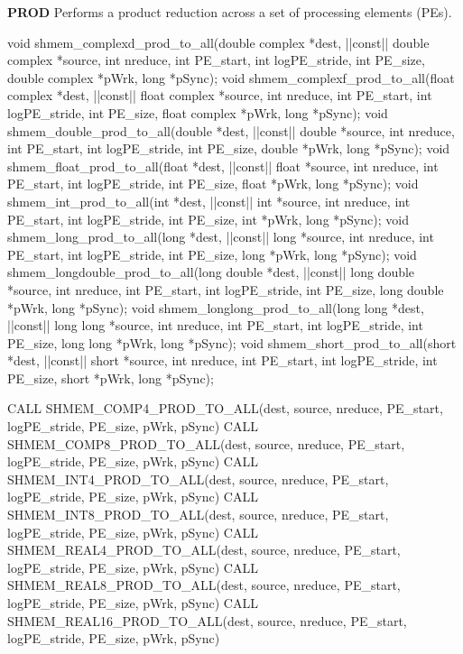 \begin{apidefinition}
\bigskip
\textbf{PROD} \newline
Performs a product reduction across a set of processing elements (\ac{PE}s).\newline
\begin{Csynopsis}
void shmem_complexd_prod_to_all(double complex *dest, |\aftergroup{}|const|\aftergroup\prevcolor| double complex *source, int nreduce, int PE_start, int logPE_stride, int PE_size, double complex *pWrk, long *pSync);
void shmem_complexf_prod_to_all(float complex *dest, |\aftergroup{}|const|\aftergroup\prevcolor| float complex *source, int nreduce, int PE_start, int logPE_stride, int PE_size, float complex *pWrk, long *pSync);
void shmem_double_prod_to_all(double *dest, |\aftergroup{}|const|\aftergroup\prevcolor| double *source, int nreduce, int PE_start, int logPE_stride, int PE_size, double *pWrk, long *pSync);
void shmem_float_prod_to_all(float *dest, |\aftergroup{}|const|\aftergroup\prevcolor| float *source, int nreduce, int PE_start, int logPE_stride, int PE_size, float *pWrk, long *pSync);
void shmem_int_prod_to_all(int *dest, |\aftergroup{}|const|\aftergroup\prevcolor| int *source, int nreduce, int PE_start, int logPE_stride, int PE_size, int *pWrk, long *pSync);
void shmem_long_prod_to_all(long *dest, |\aftergroup{}|const|\aftergroup\prevcolor| long *source, int nreduce, int PE_start, int logPE_stride, int PE_size, long *pWrk, long *pSync);
void shmem_longdouble_prod_to_all(long double *dest, |\aftergroup{}|const|\aftergroup\prevcolor| long double *source, int nreduce, int PE_start, int logPE_stride, int PE_size, long double *pWrk, long *pSync);
void shmem_longlong_prod_to_all(long long *dest, |\aftergroup{}|const|\aftergroup\prevcolor| long long *source, int nreduce, int PE_start, int logPE_stride, int PE_size, long long *pWrk, long *pSync);
void shmem_short_prod_to_all(short *dest, |\aftergroup{}|const|\aftergroup\prevcolor| short *source, int nreduce, int PE_start, int logPE_stride, int PE_size, short *pWrk, long *pSync);
\end{Csynopsis}

\begin{Fsynopsis}
CALL SHMEM_COMP4_PROD_TO_ALL(dest, source, nreduce, PE_start, logPE_stride, PE_size, pWrk, pSync)
CALL SHMEM_COMP8_PROD_TO_ALL(dest, source, nreduce, PE_start, logPE_stride, PE_size, pWrk, pSync)
CALL SHMEM_INT4_PROD_TO_ALL(dest, source, nreduce, PE_start, logPE_stride, PE_size, pWrk, pSync)
CALL SHMEM_INT8_PROD_TO_ALL(dest, source, nreduce, PE_start, logPE_stride, PE_size, pWrk, pSync)
CALL SHMEM_REAL4_PROD_TO_ALL(dest, source, nreduce, PE_start, logPE_stride, PE_size, pWrk, pSync)
CALL SHMEM_REAL8_PROD_TO_ALL(dest, source, nreduce, PE_start, logPE_stride, PE_size, pWrk, pSync)
CALL SHMEM_REAL16_PROD_TO_ALL(dest, source, nreduce, PE_start, logPE_stride, PE_size, pWrk, pSync)
\end{Fsynopsis}


\end{apidefinition}
